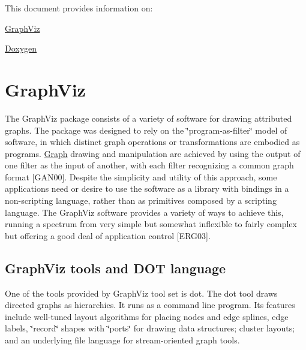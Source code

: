 This document provides information on\+:
\begin{DoxyItemize}
\item \hyperlink{panda_sdk_graphviz_tag}{Graph\+Viz}
\item \hyperlink{panda_sdk_doxygen_tag}{Doxygen}
\end{DoxyItemize}\hypertarget{panda_sdk_graphviz_tag}{}\section{Graph\+Viz}\label{panda_sdk_graphviz_tag}
The Graph\+Viz package consists of a variety of software for drawing attributed graphs. The package was designed to rely on the \char`\"{}program-\/as-\/filter\char`\"{} model of software, in which distinct graph operations or transformations are embodied as programs. \hyperlink{structGraph}{Graph} drawing and manipulation are achieved by using the output of one filter as the input of another, with each filter recognizing a common graph format \mbox{[}G\+A\+N00\mbox{]}. Despite the simplicity and utility of this approach, some applications need or desire to use the software as a library with bindings in a non-\/scripting language, rather than as primitives composed by a scripting language. The Graph\+Viz software provides a variety of ways to achieve this, running a spectrum from very simple but somewhat inflexible to fairly complex but offering a good deal of application control \mbox{[}E\+R\+G03\mbox{]}.\hypertarget{panda_sdk_graphviz_dot}{}\subsection{Graph\+Viz tools and D\+O\+T language}\label{panda_sdk_graphviz_dot}
One of the tools provided by Graph\+Viz tool set is {\ttfamily dot}. The {\ttfamily dot} tool draws directed graphs as hierarchies. It runs as a command line program. Its features include well-\/tuned layout algorithms for placing nodes and edge splines, edge labels, \char`\"{}record\char`\"{} shapes with \char`\"{}ports\char`\"{} for drawing data structures; cluster layouts; and an underlying file language for stream-\/oriented graph tools.

